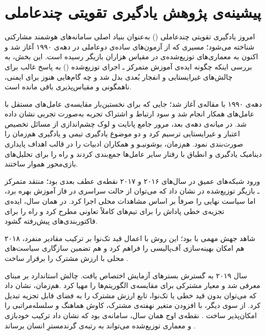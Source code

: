 \section{پیشینه‌ی پژوهش یادگیری تقویتی چندعاملی}\label{sec:marl_lit}

امروز یادگیری تقویتی چندعاملی () به‌عنوان بنیاد اصلی سامانه‌های هوشمند مشارکتی شناخته می‌شود؛ مسیری که از آزمون‌های ساده‌ی دو‌عاملی در دهه‌ی ۱۹۹۰ آغاز شد و اکنون به معماری‌های توزیع‌شده‌ی در مقیاس هزاران بازیگر رسیده است. این بخش، به بررسی اینکه چگونه ایده‌ی {آموزش متمرکز ـ اجرای توزیع‌شده} () به پاسخ غالب برای چالش‌های غیرایستایی و انفجار بُعدی بدل شد و چه گام‌هایی هنوز برای ایمنی، ناهمگونی و مقیاس‌پذیری باقی مانده است.

دهه‌ی ۱۹۹۰ با مقاله‌ی \cite{Tan1993} آغاز شد؛ جایی که برای نخستین‌بار مقایسه‌ی عامل‌های مستقل با عامل‌های همکار انجام شد و سود ارتباط و اشتراک تجربه به‌صورت تجربی نشان داده شد. در میانه‌ی دهه‌ی بعد، مرور جامع پانایت و لوک \cite{Panait2005} چشم‌اندازی از مسائل تخصیص اعتبار و غیرایستایی ترسیم کرد و دو موضوع یادگیری تیمی و یادگیری هم‌زمان را صورت‌بندی نمود.  هم‌زمان، بوشونیـو و همکاران \cite{Busoniu2008} ادبیات  را در قالب اهداف پایداری دینامیک یادگیری و انطباق با رفتار سایر عامل‌ها جمع‌بندی کردند و راه را برای تحلیل‌های بازی‌محور هموار ساختند. 

ورود شبکه‌های عمیق در سال‌های ۲۰۱۶ و ۲۰۱۷ نقطه‌ی عطف بعدی بود؛ منتقد متمرکز ـ بازیگر توزیع‌شده در  \cite{Lowe2017} نشان داد که می‌توان از حالت سراسری در فاز آموزش بهره برد، اما سیاست نهایی را صرفاً بر اساس مشاهدات محلی اجرا کرد.  در همان سال، 
\cite{Sunehag2017} ایده‌ی تجزیه‌ی خطی پاداش را برای تیم‌های کاملاً تعاونی مطرح کرد و راه را برای فاکتوربندی‌های پیش‌رفته گشود. 

۲۰۱۸ شاهد جهش مهمی با  بود؛ این روش با اعمال قید تک‌نوا بر ترکیب مقادیر منفرد، هم امکان بهینه‌سازی آف‌پالیسی را فراهم کرد و هم تضمین سازگاری سیاست‌های محلی با ارزش مشترک را برقرار ساخت \cite{Rashid2018}. 

سال ۲۰۱۹ به گسترش بسترهای آزمایش اختصاص یافت. چالش استاندارد  بر مبنای  معرفی شد و معیار مشترکی برای مقایسه‌ی الگوریتم‌ها را مهیا کرد \cite{Samvelyan2019SMAC}.هم‌زمان،  \cite{Son2019QTRAN} نشان داد که می‌توان بدون قید خطی یا تک‌نوا، تابع ارزش مشترک را به فضای قابل تجزیه تبدیل کرد. از سوی دیگر،  با افزودن متغیر نهفته‌ی مشترک، کاوش هماهنگ و سلسله‌مراتبی را امکان‌پذیر ساخت \cite{Mahajan2019MAVEN}.  نقطه‌ی اوج همان سال، سامانه‌ی  بود که نشان داد ترکیب خودبازی و معماری توزیع‌شده می‌تواند به رتبه‌ی گرندمسترِ انسان برساند \cite{Vinyals2019AlphaStar}. 

